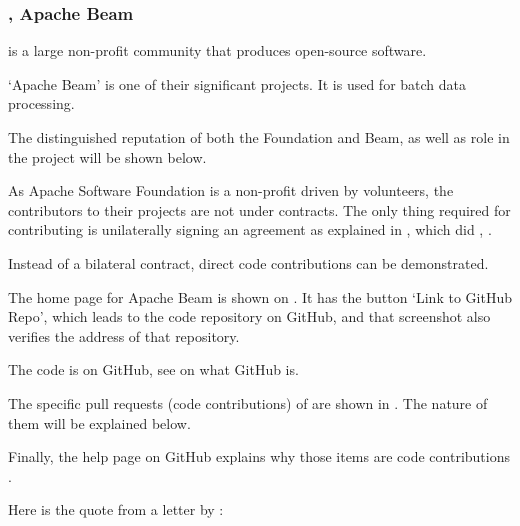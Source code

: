 \subsubsection{\Asf, Apache Beam}
\label{subsubsec:RoleApache}


\Asf is a large non-profit community that produces open-source software.

`Apache Beam' is one of their significant projects.
It is used for batch data processing.

The distinguished reputation of both the Foundation and Beam, as well as \mrls role
in the project will be shown below.


As Apache Software Foundation is a non-profit driven by volunteers,
the contributors to their projects are not under contracts.
The only thing required for contributing is unilaterally signing an agreement
as explained in ,
which \mrl did , .

Instead of a bilateral contract, direct code contributions can be demonstrated.

The home page for Apache Beam is shown on .
It has the button `Link to GitHub Repo', which leads to the code repository on GitHub,
and that screenshot also verifies the address of that repository.

The code is on GitHub, see  on what GitHub is.

The specific pull requests (code contributions) of \mrl are shown in .
The nature of them will be explained below.

Finally, the help page on GitHub explains why those items are code contributions .



Here is the quote from a letter by \MrApacheT:

